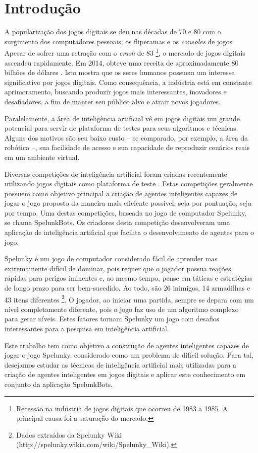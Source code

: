 \chapter{\label{chap:intro}Introdução}
A popularização dos jogos digitais se deu nas décadas de 70 e 80 com o
surgimento dos computadores pessoais, os fliperamas e os \textit{consoles} de
jogos. Apesar de sofrer uma retração com o \textit{crash} de 83
\footnote{Recessão na indústria de jogos digitais que ocorreu de 1983 a 1985. A
principal causa foi a saturação do mercado.}, o mercado de jogos digitais
ascendeu rapidamente. Em 2014, obteve uma receita de aproximadamente 80 bilhões
de dólares \cite{VIDEOGAMEREVENUE}. Isto mostra que os seres humanos possuem um
interesse significativo por jogos digitais. Como consequência, a indústria está
em constante aprimoramento, buscando produzir jogos mais interessantes,
inovadores e desafiadores, a fim de manter seu público alvo e atrair novos
jogadores.

Paralelamente, a área de inteligência artificial vê em jogos digitais um grande
potencial para servir de plataforma de testes para seus algoritmos e técnicas.
Alguns dos motivos são seu baixo custo -- se comparado, por exemplo, a área da
robótica --, sua facilidade de acesso e sua capacidade de reproduzir cenários
reais em um ambiente virtual.

Diversas competições de inteligência artificial foram criadas recentemente
utilizando jogos digitais como plataforma de teste \cite{GameAiCompetition}.
Estas competições geralmente possuem como objetivo principal a criação de
agentes inteligentes capazes de jogar o jogo proposto da maneira mais eficiente
possível, seja por pontuação, seja por tempo. Uma destas competições, baseada no
jogo de computador Spelunky, se chama SpelunkBots. Os criadores desta competição
desenvolveram uma aplicação de inteligência artificial que facilita o
desenvolvimento de agentes para o jogo.

Spelunky é um jogo de computador considerado fácil de aprender mas extremamente
difícil de dominar, pois requer que o jogador possua reações rápidas para
perigos iminentes e, ao mesmo tempo, pense em táticas e estratégias de longo
prazo para ser bem-sucedido. Ao todo, são 26 inimigos, 14 armadilhas e 43 itens
diferentes \footnote{Dados extraídos da Spelunky Wiki
(http://spelunky.wikia.com/wiki/Spelunky\_Wiki).}. O jogador, ao iniciar uma
partida, sempre se depara com um nível completamente diferente, pois o jogo faz
uso de um algoritmo complexo para gerar níveis. Estes fatores tornam Spelunky um
jogo com desafios interessantes para a pesquisa em inteligência artificial.

Este trabalho tem como objetivo a construção de agentes inteligentes capazes de
jogar o jogo Spelunky, considerado como um problema de difícil solução. Para
tal, desejamos estudar as técnicas de inteligência artificial mais utilizadas
para a criação de agentes inteligentes em jogos digitais e aplicar este
conhecimento em conjunto da aplicação SpelunkBots.
